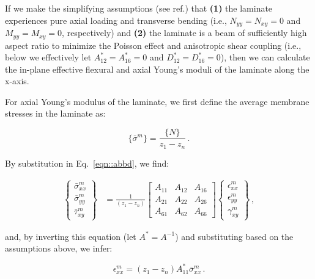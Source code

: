 \documentclass[twocolumn, linenumbers, superscriptaddress]{revtex4-1}
\begin{document}
				If we make the simplifying assumptions (see ref.) that \textbf{(1)} the laminate experiences pure axial loading and transverse bending (i.e., $N_{yy} = N_{xy} = 0$ and $M_{yy} = M_{xy} = 0$, respectively) and \textbf{(2)} the laminate is a beam of sufficiently high aspect ratio to minimize the Poisson effect and anisotropic shear coupling (i.e., below we effectively let $A^*_{12} = A^*_{16} = 0$ and $D^*_{12} = D^*_{16} = 0$), then we can calculate the in-plane effective flexural and axial Young's moduli of the laminate along the x-axis.
				
				For axial Young's modulus of the laminate, we first define the average membrane stresses in the laminate as:
				
				\begin{equation}
					\{\bar{\sigma}^m\} = \frac{\{N\}}{z_1 - z_n}\,.
				\end{equation}
				
				By substitution in Eq.~\ref{eqn::abbd}, we find:
				
				\begin{equation}
					\begin{aligned}
						\begin{Bmatrix}
							\bar{\sigma}^m_{xx} \\
							\bar{\sigma}^m_{yy} \\
							\bar{\tau}^m_{xy}
						\end{Bmatrix}
						& = \frac{1}{(z_1 - z_n)}
						\begin{bmatrix}
							A_{11} & A_{12} & A_{16} \\
							A_{21} & A_{22} & A_{26} \\
							A_{61} & A_{62} & A_{66}
						\end{bmatrix}
						\begin{Bmatrix}
							\epsilon^m_{xx} \\
							\epsilon^m_{yy} \\
							\gamma^m_{xy}
						\end{Bmatrix}\,,
					\end{aligned}
				\end{equation}
				
				and, by inverting this equation (let $A^* = A^{-1}$) and substituting based on the assumptions above, we infer:
				
				\begin{equation}
					\epsilon^m_{xx} = (z_1 - z_n)A^{*}_{11}\bar{\sigma}^m_{xx}\,.
				\end{equation}
				
\end{document}
